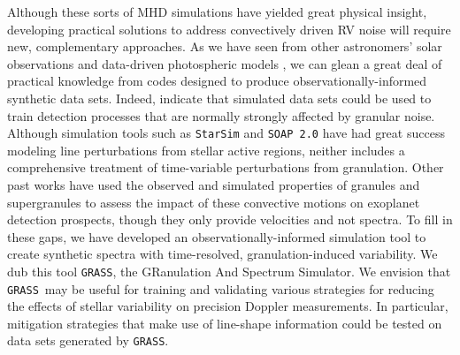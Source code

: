 \documentclass[twocolumn]{aastex63}
\newcommand{\ms}{{\rm m\ s}^{-1}}
\newcommand{\grass}{\texttt{GRASS}}
\newcommand{\revise}[1]{#1}
\begin{document}
% 
\begin{figure*}[htb!]
\caption{Temporal and spatial variability in input bisectors encode turbulent granulation velocities. \textbf{Left:} To capture the line-of-sight variation observed in solar bisectors, observations were carried out at many discrete disk positions along each of the four solar limbs plus disk center. Figure adapted from Figure 1 of . \textbf{Right:} Line bisectors differ in shape with both time and apparent position on the solar disk. From disk center ($\mu = 1$) to the limb ($\mu = 0$), bisectors transition from a distorted ``C"-shape to something more resembling a ``\textbackslash"-shape. This behavior results from the different viewing angles of convective granules along different lines of sight \citep[Figure 17.13 of ][]{Gray2008}. The solid, \revise{dashed, and dotted} lines trace the time-averaged bisector for each limb position. The shaded regions correspond to the $\pm1\sigma$ temporal variability of the bisectors at each limb position. Error bars in velocity are not shown; with an absolute wavelength calibration accuracy on order $\sim$$0.02$ m\AA\ ($\sim$1 $\ms$), the observed temporal variations are much larger than the typical uncertainty.}
\label{fig:one}
\end{figure*}

Although these sorts of MHD simulations have yielded great physical insight, developing practical solutions to address convectively driven RV noise will require \revise{new, complementary} approaches. As we have seen from other astronomers' solar observations and data-driven photospheric models \citep[e.g.,][]{Dumusque2014, Haywood2016}, we can glean a great deal of practical knowledge from codes designed to produce observationally-informed synthetic data sets. \revise{Indeed, \citet{Sulis2017} indicate that simulated data sets could be used to train detection processes that are normally strongly affected by granular noise.} Although \revise{simulation tools such as} \texttt{StarSim} and \texttt{SOAP 2.0} have had great success modeling line perturbations from stellar active regions, neither includes a comprehensive treatment of time-variable perturbations from granulation. \revise{Other past works have used the observed and simulated properties of granules \citep{Meunier2015} and supergranules \citep{Meunier2019, Meunier2020a} to assess the impact of these convective motions on exoplanet detection prospects, though they only provide velocities and not spectra.} To fill in \revise{these gaps,} we have developed an observationally-informed simulation tool to create synthetic spectra with time-resolved, granulation-induced variability. We dub this tool \texttt{GRASS}, the GRanulation And Spectrum Simulator. \revise{We envision that \grass\ may be useful for training and validating various strategies for reducing the effects of stellar variability on precision Doppler measurements. In particular, mitigation strategies that make use of line-shape information could be tested on data sets generated by \grass. } \par 
\end{document}
